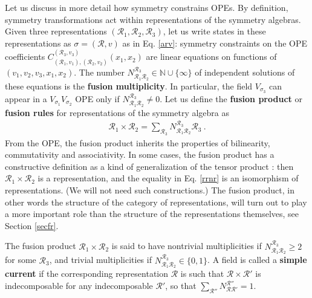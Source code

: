 \documentclass[12pt, a4paper, notitlepage, twoside]{report}
\numberwithin{equation}{section}
\theoremstyle{break}
\begin{document}
Let us discuss in more detail how symmetry constrains OPEs. By definition, symmetry transformations act within representations of the symmetry algebras. Given three representations $(\mathcal{R}_1,\mathcal{R}_2,\mathcal{R}_3)$, let us write states in these representations as $\sigma=(\mathcal{R},v)$ as in Eq. \eqref{arv}: symmetry constraints on the OPE coefficients $C_{(\mathcal{R}_1,v_1),(\mathcal{R}_2,v_2)}^{(\mathcal{R}_3,v_3)}(x_1,x_2)$ are linear equations on functions of $(v_1,v_2,v_3,x_1,x_2)$. The number $N_{\mathcal{R}_1\mathcal{R}_2}^{\mathcal{R}_3}\in {\mathbb{N}} \cup \{\infty\}$ of independent solutions of these equations is the \textbf{\boldmath fusion multiplicity}. 
In particular, the field $V_{\sigma_3}$ can appear in a $V_{\sigma_1}V_{\sigma_2}$ OPE only if $N_{\mathcal{R}_1\mathcal{R}_2}^{\mathcal{R}_3}\neq 0$. Let us define the \textbf{\boldmath fusion product} or \textbf{\boldmath fusion rules} for representations of the symmetry algebra as 
 \begin{align}
 \mathcal{R}_1 \times \mathcal{R}_2  = \sum_{\mathcal{R}_3} N_{\mathcal{R}_1\mathcal{R}_2}^{\mathcal{R}_3} \mathcal{R}_3 \ . 
\label{rrnr}
\end{align}
From the OPE, the fusion product inherits the properties of bilinearity, commutativity and associativity. 
In some cases, the fusion product has a constructive definition as a kind of generalization of the tensor product \cite{gab99, kr18}: then $ \mathcal{R}_1 \times \mathcal{R}_2$ is a representation, and the equality in Eq. \eqref{rrnr} is an isomorphism of representations. (We will not need such constructions.) The fusion product, in other words the structure of the category of representations, will turn out to play a more important role than the structure of the representations themselves, see Section \ref{secfr}.  

The fusion product $\mathcal{R}_1\times \mathcal{R}_2$ is said to have nontrivial multiplicities if $N_{\mathcal{R}_1\mathcal{R}_2}^{\mathcal{R}_3}\geq 2$ for some $\mathcal{R}_3$, and trivial multiplicities if $N_{\mathcal{R}_1\mathcal{R}_2}^{\mathcal{R}_3}\in \{0,1\}$.
A field is called a \textbf{\boldmath simple current} if the corresponding representation $\mathcal{R}$ is such that $\mathcal{R}\times \mathcal{R}'$ is indecomposable for any indecomposable $\mathcal{R}'$, so that $\sum_{\mathcal{R}''} N_{\mathcal{R}\mathcal{R}'}^{\mathcal{R}''} =1$. 
\end{document}
